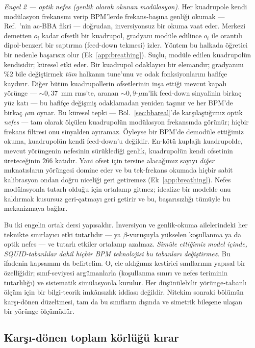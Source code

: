 \documentclass[aps,prab,reprint,superscriptaddress,nofootinbib]{revtex4-2}
\begin{document}
\emph{Engel 2 --- optik nefes (genlik olarak okunan modülasyon).} Her kuadrupole
kendi modülasyon frekansını verip BPM'lerde frekans-başına genliği okumak ---
Ref.~\cite{marti}'nin ac-BBA fikri --- doğrudan, inversiyonsuz bir okuma vaat eder.
Merkezi demetten $o_i$ kadar ofsetli bir kuadrupol, gradyanı modüle edilince $o_i$
ile orantılı dipol-benzeri bir saptırma (feed-down tekmesi) izler. Yöntem bu halkada
öğretici bir nedenle başarısız olur (Ek~\ref{app:breathing}). Suçlu, modüle edilen
kuadrupolün kendisidir; küresel etki eder. Bir kuadrupol odaklayıcı bir elemandır;
gradyanını $\%2$ bile değiştirmek \emph{tüm} halkanın tune'unu ve odak
fonksiyonlarını hafifçe kaydırır. Diğer bütün kuadrupollerin ofsetlerinin inşa
ettiği mevcut kapalı yörünge --- $\sim\!0{,}37$~mm rms'te, aranan $\sim\!0{,}9$-$\mu$m'lik
feed-down sinyalinin birkaç yüz katı --- bu hafifçe değişmiş odaklamadan yeniden
taşınır ve her BPM'de birkaç $\mu$m oynar. Bu küresel tepki --- Böl.~\ref{sec:bbareal}'de
karşılaştığımız optik \emph{nefes} --- tam olarak ölçülen kuadrupolün modülasyon
frekansında görünür; hiçbir frekans filtresi onu sinyalden ayıramaz. Öyleyse bir
BPM'de demodüle ettiğimiz okuma, kuadrupolün kendi feed-down'u değildir. En-kötü
kuplajlı kuadrupolde, mevcut yörüngenin nefesinin sürüklediği genlik, kuadrupolün
kendi ofsetinin üreteceğinin $266$ katıdır. Yani ofset için tersine alacağımız sayıyı
\emph{diğer} mıknatısların yörüngesi domine eder ve bu tek-frekans okumada hiçbir
sabit kalibrasyon ondan doğru niceliği geri getiremez (Ek~\ref{app:breathing}). Nefes
modülasyonla tutarlı olduğu için ortalanıp gitmez; idealize bir modelde onu kaldırmak
kusursuz geri-çatmayı geri getirir ve bu, başarısızlığı tümüyle bu mekanizmaya bağlar.

Bu iki engelin ortak dersi yapısaldır. İnversiyon ve genlik-okuma ailelerindeki her
teknikte sınırlayıcı etki tutarlıdır --- ya $\beta$-vuruşuyla yükselen koşullanma ya
da optik nefes --- ve tutarlı etkiler ortalanıp azalmaz. \emph{Simüle ettiğimiz model
içinde, SQUID-tabanlılar dahil hiçbir BPM teknolojisi bu tabanları değiştirmez.} Bu
ifadenin kapsamını da belirtelim. O, ele aldığımız kestirici sınıflarının yapısal bir
özelliğidir; sınıf-seviyesi argümanlarla (koşullanma sınırı ve nefes teriminin
tutarlılığı) ve sistematik simülasyonla kurulur. Her düşünülebilir yörünge-tabanlı
ölçüm için bir bilgi-teorik imkânsızlık iddiası değildir. Nitekim sonraki bölümün
karşı-dönen düzeltmesi, tam da bu sınıfların dışında ve simetrik bileşene ulaşan bir
yörünge ölçümüdür.

\subsection{Karşı-dönen toplam körlüğü kırar}
\label{sec:polarity}
\end{document}
